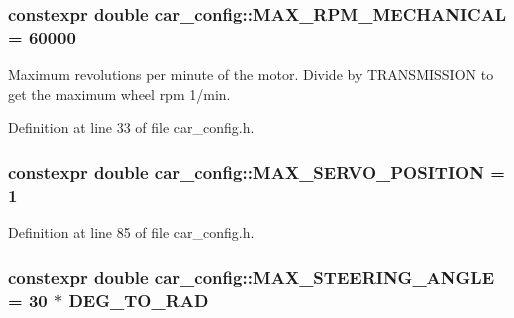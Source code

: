 \subsubsection[{\texorpdfstring{M\+A\+X\+\_\+\+R\+P\+M\+\_\+\+M\+E\+C\+H\+A\+N\+I\+C\+AL}{MAX_RPM_MECHANICAL}}]{\setlength{\rightskip}{0pt plus 5cm}constexpr double car\+\_\+config\+::\+M\+A\+X\+\_\+\+R\+P\+M\+\_\+\+M\+E\+C\+H\+A\+N\+I\+C\+AL = 60000}\hypertarget{namespacecar__config_ad35069a183782259c6280aa219b72ffa}{}\label{namespacecar__config_ad35069a183782259c6280aa219b72ffa}


Maximum revolutions per minute of the motor. Divide by T\+R\+A\+N\+S\+M\+I\+S\+S\+I\+ON to get the maximum wheel rpm  1/min. 



Definition at line 33 of file car\+\_\+config.\+h.

\subsubsection[{\texorpdfstring{M\+A\+X\+\_\+\+S\+E\+R\+V\+O\+\_\+\+P\+O\+S\+I\+T\+I\+ON}{MAX_SERVO_POSITION}}]{\setlength{\rightskip}{0pt plus 5cm}constexpr double car\+\_\+config\+::\+M\+A\+X\+\_\+\+S\+E\+R\+V\+O\+\_\+\+P\+O\+S\+I\+T\+I\+ON = 1}\hypertarget{namespacecar__config_af1712762f3ad9f8805ba474d5f3e7274}{}\label{namespacecar__config_af1712762f3ad9f8805ba474d5f3e7274}


Definition at line 85 of file car\+\_\+config.\+h.

\subsubsection[{\texorpdfstring{M\+A\+X\+\_\+\+S\+T\+E\+E\+R\+I\+N\+G\+\_\+\+A\+N\+G\+LE}{MAX_STEERING_ANGLE}}]{\setlength{\rightskip}{0pt plus 5cm}constexpr double car\+\_\+config\+::\+M\+A\+X\+\_\+\+S\+T\+E\+E\+R\+I\+N\+G\+\_\+\+A\+N\+G\+LE = 30 $\ast$ {\bf D\+E\+G\+\_\+\+T\+O\+\_\+\+R\+AD}}\hypertarget{namespacecar__config_a967b325af26effe80fbbc64dc68a36a0}{}\label{namespacecar__config_a967b325af26effe80fbbc64dc68a36a0}


